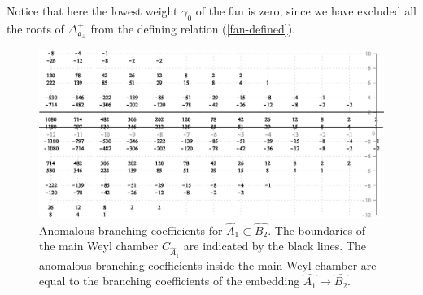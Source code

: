 \documentclass[12pt]{iopart}
\theoremstyle{definition}
\newcommand{\afb}{\mathfrak{a}_{\bot}}
\begin{document}
Notice that here the lowest weight  $\gamma_0$ of the fan  is zero, since we have excluded all the roots of $\Delta^{+}_{\afb}$ from the defining relation (\ref{fan-defined}).

\begin{figure}[h!bt]
  \centering
  \includegraphics[width=120mm]{figure13.eps}
  \caption{Anomalous branching coefficients for $\hat{A_1}\subset \hat{B_2}$.  The boundaries  of the main Weyl chamber $\bar{C}_{\hat{A}_1}$
 are indicated by the black lines. The anomalous branching coefficients inside the main Weyl chamber are equal to the branching coefficients of the embedding $\hat{A_1}\longrightarrow \hat{B_2}$.}
  \label{fig:AffineB2_A1_branching}
\end{figure}
\end{document}
